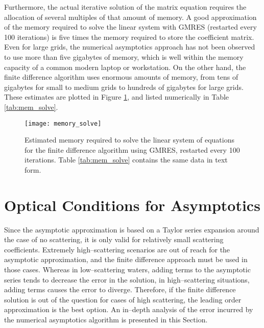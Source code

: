 Furthermore, the actual iterative solution of the matrix equation requires the allocation of several multiples of that amount of memory.
A good approximation of the memory required to solve the linear system with GMRES (restarted every 100 iterations) is five times the memory required to store the coefficient matrix.
Even for large grids, the numerical asymptotics approach has not been observed to use more than five gigabytes of memory, which is well within the memory capacity of a common modern laptop or workstation.
On the other hand, the finite difference algorithm uses enormous amounts of memory, from tens of gigabytes for small to medium grids to hundreds of gigabytes for large grids.
These estimates are plotted in Figure \ref{fig:mem_solve}, and listed numerically in Table \ref{tab:mem_solve}.
\begin{figure}[H]
  \centering
  \texttt{[image: memory\_solve]}
  \caption{Estimated memory required to solve the linear system of equations for the finite difference algorithm using GMRES, restarted every 100 iterations. Table \ref{tab:mem_solve} contains the same data in text form.}
  \label{fig:mem_solve}
\end{figure}

\section{Optical Conditions for Asymptotics}
Since the asymptotic approximation is based on a Taylor series expansion around the case of no scattering, it is only valid for relatively small scattering coefficients.
Extremely high--scattering scenarios are out of reach for the asymptotic approximation, and the finite difference approach must be used in those cases.
Whereas in low--scattering waters, adding terms to the asymptotic series tends to decrease the error in the solution, in high--scattering situations, adding terms causes the error to diverge.
Therefore, if the finite difference solution is out of the question for cases of high scattering, the leading order approximation is the best option.
An in--depth analysis of the error incurred by the numerical asymptotics algorithm is presented in this Section.

